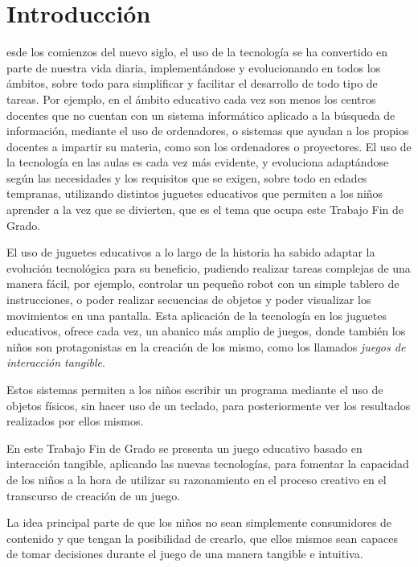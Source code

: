 \chapter{Introducción}

\noindent
{}esde los comienzos del nuevo siglo, el uso de la tecnología se ha convertido en parte de nuestra vida diaria, implementándose y evolucionando en todos los ámbitos, sobre todo para simplificar y facilitar el desarrollo de todo tipo de tareas. Por ejemplo, en el ámbito educativo cada vez son menos los centros docentes que no cuentan con un sistema informático aplicado a la búsqueda de información, mediante el uso de ordenadores, o sistemas que ayudan a los propios docentes a impartir su materia, como son los ordenadores o proyectores. El uso de la tecnología en las aulas es cada vez más evidente, y evoluciona adaptándose según las necesidades y los requisitos que se exigen, sobre todo en edades tempranas, utilizando distintos juguetes educativos que permiten a los niños aprender a la vez que se divierten, que es el tema que ocupa este Trabajo Fin de Grado.

El uso de juguetes educativos a lo largo de la historia ha sabido adaptar la evolución tecnológica para su beneficio, pudiendo realizar tareas complejas de una manera fácil, por ejemplo, controlar un pequeño robot con un simple tablero de instrucciones, o poder realizar secuencias de objetos y poder visualizar los movimientos en una pantalla. Esta aplicación de la tecnología en los juguetes educativos, ofrece cada vez, un abanico más amplio de juegos, donde también los niños son protagonistas en la creación de los mismo, como los llamados \emph{juegos de interacción tangible}.

Estos sistemas permiten a los niños escribir un programa mediante el uso de objetos físicos, sin hacer uso de un teclado, para posteriormente ver los resultados realizados por ellos mismos.

En este Trabajo Fin de Grado se presenta un juego educativo basado en interacción tangible, aplicando las nuevas tecnologías, para fomentar la capacidad de los niños a la hora de utilizar su razonamiento en el proceso creativo en el transcurso de creación de un juego. 

La idea principal parte de que los niños no sean simplemente consumidores de contenido y que tengan la posibilidad de crearlo, que ellos mismos sean capaces de tomar decisiones durante el juego de una manera tangible e intuitiva.




